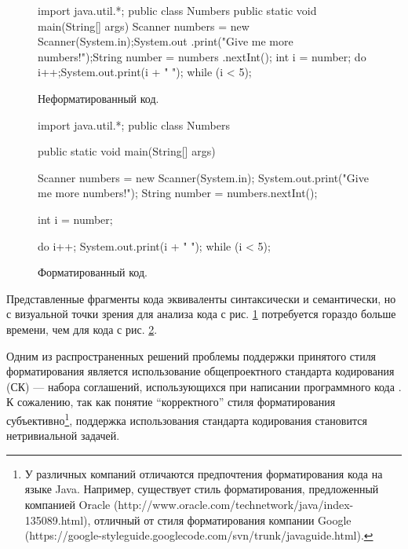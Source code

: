 \documentclass{matmex-diploma}
\begin{document}
\begin{figure}[ht]
    \begin{pyglist}[language=java,numbers=left,numbersep=5pt]
    import java.util.*;
    public class Numbers {public static void
    main(String[] 
    args) {    Scanner numbers = new Scanner(System.in);System.out
    .print("Give me more numbers!");String number = numbers
    .nextInt(); int i = number;     do {i++;System.out.print(i + " ");} 
    while (i < 5);}}
    \end{pyglist}
\caption{Неформатированный код.}    
\label{uglyCode}
\end{figure}

\begin{figure}[ht]
    \begin{pyglist}[language=java,numbers=left,numbersep=5pt]
    import java.util.*;
    public class Numbers {
      public static void main(String[] args) {
        Scanner numbers = new Scanner(System.in);
        System.out.print("Give me more numbers!");
        String number = numbers.nextInt();
        
        int i = number;
        
        do {
            i++;
            System.out.print(i + " ");
        } while (i < 5);
      }
    }
    \end{pyglist}
\caption{Форматированный код.}    
\label{formattedCode}
\end{figure}

Представленные фрагменты кода эквиваленты синтаксически и семантически, но с визуальной точки зрения для анализа кода с рис. \ref{uglyCode} потребуется гораздо больше времени, чем для кода с рис. \ref{formattedCode}.

Одним из распространенных решений проблемы поддержки принятого стиля форматирования является использование общепроектного стандарта кодирования (СК) --- набора соглашений, использующихся при написании программного кода \cite{artOfAgile, indentation}. К сожалению, так как понятие “корректного” стиля форматирования субъективно\footnote{У различных компаний отличаются предпочтения форматирования кода на языке Java. Например, существует стиль форматирования, предложенный компанией Oracle (http://www.oracle.com/technetwork/java/index-135089.html), отличный от стиля форматирования компании Google (https://google-styleguide.googlecode.com/svn/trunk/javaguide.html).}, поддержка использования стандарта кодирования становится нетривиальной задачей. 
\end{document}
